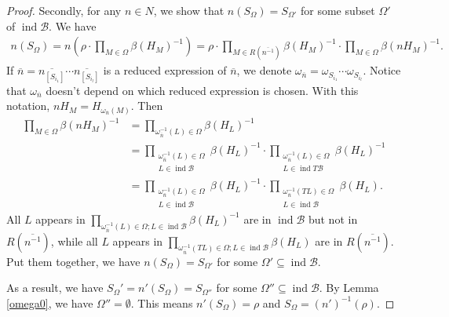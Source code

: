 \documentclass[12pt]{amsart}
\begin{document}
\begin{proof}
    Secondly, for any $n\in N$, we show that $n(S_{\Omega}) = S_{\Omega'}$ for some subset $\Omega'$ of $\operatorname{ind}\mathcal{B}$.
    We have 
    \begin{align*}
        n(S_{\Omega}) = n(\rho\cdot \prod_{M\in \Omega} \beta(H_M)^{-1}) = \rho \cdot \prod_{M\in R(\overline{n^{-1}})} \beta(H_M)^{-1}  \cdot \prod_{M\in \Omega} \beta(nH_M)^{-1}.
    \end{align*}
    If $\overline{n} = \overline{n_{[S_{i_1}]}}\cdots\overline{n_{[S_{i_l}]}}$ is a reduced expression of $\overline{n}$, we denote $\omega_{\overline{n}} = \omega_{S_{i_1}}\cdots \omega_{S_{i_l}}$.
    Notice that $\omega_{\overline{n}}$ doesn't depend on which reduced expression is chosen.
    With this notation, $nH_M=H_{\omega_{\overline{n}}(M)}$.
    Then 
    \begin{align*}
        \prod_{M\in \Omega} \beta(nH_M)^{-1} &= \prod_{\omega_{\overline{n}}^{-1}(L)\in \Omega} \beta(H_L)^{-1} \\
         &=  \prod_{\substack{\omega_{\overline{n}}^{-1}(L)\in \Omega \\ L\in \operatorname{ind}\mathcal{B}}} \beta(H_L)^{-1} \cdot \prod_{\substack{\omega_{\overline{n}}^{-1}(L)\in \Omega \\ L\in \operatorname{ind}T\mathcal{B}}} \beta(H_L)^{-1} \\
         &=\prod_{\substack{\omega_{\overline{n}}^{-1}(L)\in \Omega \\ L\in \operatorname{ind}\mathcal{B}}} \beta(H_L)^{-1} \cdot \prod_{\substack{\omega_{\overline{n}}^{-1}(TL)\in \Omega \\ L\in \operatorname{ind}\mathcal{B}}} \beta(H_L).
    \end{align*}
    All $L$ appears in $\prod_{\omega_{\overline{n}}^{-1}(L)\in \Omega ; L\in \operatorname{ind}\mathcal{B}} \beta(H_L)^{-1} $ are in $\operatorname{ind}\mathcal{B}$ but not in $R(\overline{n^{-1}})$, 
    while all $L$ appears in $\prod_{\omega_{\overline{n}}^{-1}(TL)\in \Omega ; L\in \operatorname{ind}\mathcal{B}} \beta(H_L) $ are in $R(\overline{n^{-1}})$.
    Put them together, we have $n(S_{\Omega}) = S_{\Omega'}$ for some $\Omega'\subseteq \operatorname{ind}\mathcal{B}$.

    As a result, we have $S_{\Omega}' = n'(S_{\Omega}) = S_{\Omega''}$ for some $\Omega''\subseteq \operatorname{ind}\mathcal{B}$.
    By Lemma \ref{omega0}, we have $\Omega''=\emptyset$.
    This means $n'(S_{\Omega}) = \rho$ and $S_{\Omega}=(n')^{-1}(\rho)$.
\end{proof}
\end{document}
